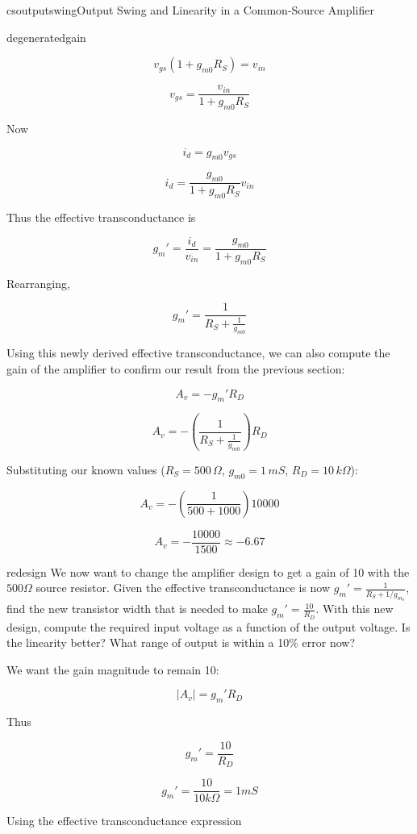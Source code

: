 \begin{mainquestion}{csoutputswing}{Output Swing and Linearity in a Common-Source Amplifier}
\begin{partquestion}{degeneratedgain}
\begin{answer}[3in]
\[
v_{gs}(1+g_{m0}R_S)=v_{in}
\]

\[
v_{gs}=\frac{v_{in}}{1+g_{m0}R_S}
\]

Now

\[
i_d=g_{m0}v_{gs}
\]

\[
i_d=
\frac{g_{m0}}{1+g_{m0}R_S}v_{in}
\]

Thus the effective transconductance is

\[
g_m'=\frac{i_d}{v_{in}}
=
\frac{g_{m0}}{1+g_{m0}R_S}
\]

Rearranging,

\[
g_m'=\frac{1}{R_S+\frac{1}{g_{m0}}}
\]

Using this newly derived effective transconductance, we can also compute the gain of the amplifier to confirm our result from the previous section:

\[
A_v = -g_m' R_D
\]

\[
A_v = - \left( \frac{1}{R_S + \frac{1}{g_{m0}}} \right) R_D
\]

Substituting our known values ($R_S = 500\,\Omega$, $g_{m0} = 1\,mS$, $R_D = 10\,k\Omega$):

\[
A_v = - \left( \frac{1}{500 + 1000} \right) 10000
\]

\[
A_v = -\frac{10000}{1500} \approx -6.67
\]
\end{answer}

\end{partquestion}

\begin{partquestion}{redesign}
{We now want to change the amplifier design to get a gain of 10 with the $500\Omega$ source resistor. Given the effective transconductance is now $g_m'=\frac{1}{R_S+1/g_{m_o}}$, find the new transistor width that is needed to make $g_m'=\frac{10}{R_D}$.  With this new design, compute the required input voltage as a function of the output voltage.  Is the linearity better? What range of output is within a 10\% error now?}

\begin{answer}[2.5in]
We want the gain magnitude to remain 10:

\[
|A_v| = g_m' R_D
\]

Thus

\[
g_m' = \frac{10}{R_D}
\]

\[
g_m' = \frac{10}{10k\Omega}
=1mS
\]

Using the effective transconductance expression


\end{answer}
\end{partquestion}
\end{mainquestion}
